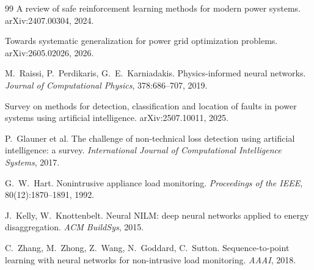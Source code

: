 \documentclass[10pt,a4paper,oneside]{article}
\begin{document}
\begin{thebibliography}{99}
A review of safe reinforcement learning methods for modern power systems.
arXiv:2407.00304, 2024.

Towards systematic generalization for power grid optimization problems.
arXiv:2605.02026, 2026.

M.~Raissi, P.~Perdikaris, G.~E.~Karniadakis. Physics-informed neural
networks. \textit{Journal of Computational Physics}, 378:686--707, 2019.

Survey on methods for detection, classification and location of faults in
power systems using artificial intelligence. arXiv:2507.10011, 2025.

P.~Glauner et al. The challenge of non-technical loss detection using
artificial intelligence: a survey. \textit{International Journal of
Computational Intelligence Systems}, 2017.

G.~W.~Hart. Nonintrusive appliance load monitoring. \textit{Proceedings of
the IEEE}, 80(12):1870--1891, 1992.

J.~Kelly, W.~Knottenbelt. Neural NILM: deep neural networks applied to energy
disaggregation. \textit{ACM BuildSys}, 2015.

C.~Zhang, M.~Zhong, Z.~Wang, N.~Goddard, C.~Sutton. Sequence-to-point
learning with neural networks for non-intrusive load monitoring.
\textit{AAAI}, 2018.

\end{thebibliography}
\end{document}
